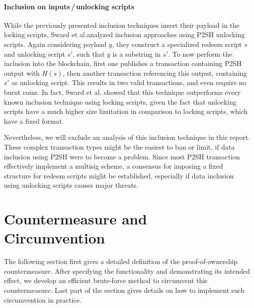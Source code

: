 \documentclass[a4paper,11pt,titlepage]{scrbook}
\begin{document}
\subsubsection*{Inclusion on inputs\,/\,unlocking scripts}
While the previously presented inclusion techniques insert their payload in the locking scripts, Sward et al.\@ analyzed inclusion approaches using P2SH unlocking scripts.
Again considering payload $y$, they construct a specialized redeem script $s$ and unlocking script $s'$, 
such that $y$ is a substring in $s'$.
To now perform the inclusion into the blockchain, first one publishes a transaction containing P2SH output with $H(s)$, then another transaction referencing this output, containing $s'$ as unlocking script.
This results in two valid transactions, and even require no burnt coins.
In fact, Sward et al. showed that this technique outperforms every known inclusion technique using locking scripts, given the fact that unlocking scripts have a much higher size limitation in comparison to locking scripts, which have a fixed format. \cite{sward_data_2018}

Nevertheless, we will exclude an analysis of this inclusion technique in this report.
These complex transaction types might be the easiest to ban or limit, if data inclusion using P2SH were to become a problem.
Since most P2SH transaction effectively implement a multisig scheme, a consensus for imposing a fixed structure for redeem scripts might be established, especially if data inclusion using unlocking scripts causes major threats.






\chapter{Countermeasure and Circumvention}

The following section first gives a detailed definition of the proof-of-ownership countermeasure. After specifying the functionality and demonstrating its intended effect, we develop an efficient brute-force method to circumvent this countermeasure. Last part of the section gives details on how to implement such circumvention in practice.
\end{document}
